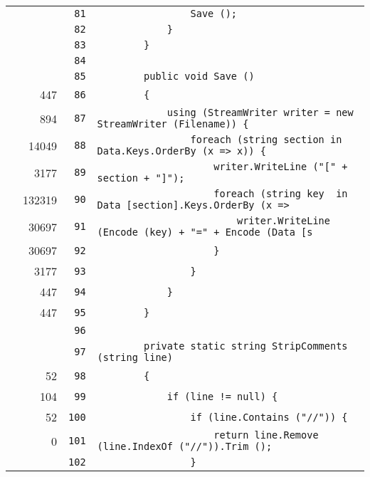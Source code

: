 \documentclass[a4paper,10pt]{article}
\begin{document}
\begin{longtable}[l]{lrrl}
\cellcolor{gray} &  & \verb~81~ & \verb~                Save ();~\\
\cellcolor{gray} &  & \verb~82~ & \verb~            }~\\
\cellcolor{gray} &  & \verb~83~ & \verb~        }~\\
\cellcolor{gray} &  & \verb~84~ & \verb~~\\
\cellcolor{gray} &  & \verb~85~ & \verb~        public void Save ()~\\
\cellcolor{green} & 447 & \verb~86~ & \verb~        {~\\
\cellcolor{green} & 894 & \verb~87~ & \verb~            using (StreamWriter writer = new StreamWriter (Filename)) {~\\
\cellcolor{green} & 14049 & \verb~88~ & \verb~                foreach (string section in Data.Keys.OrderBy (x => x)) {~\\
\cellcolor{green} & 3177 & \verb~89~ & \verb~                    writer.WriteLine ("[" + section + "]");~\\
\cellcolor{green} & 132319 & \verb~90~ & \verb~                    foreach (string key  in Data [section].Keys.OrderBy (x => ~\\
\cellcolor{green} & 30697 & \verb~91~ & \verb~                        writer.WriteLine (Encode (key) + "=" + Encode (Data [s~\\
\cellcolor{green} & 30697 & \verb~92~ & \verb~                    }~\\
\cellcolor{green} & 3177 & \verb~93~ & \verb~                }~\\
\cellcolor{green} & 447 & \verb~94~ & \verb~            }~\\
\cellcolor{green} & 447 & \verb~95~ & \verb~        }~\\
\cellcolor{gray} &  & \verb~96~ & \verb~~\\
\cellcolor{gray} &  & \verb~97~ & \verb~        private static string StripComments (string line)~\\
\cellcolor{green} & 52 & \verb~98~ & \verb~        {~\\
\cellcolor{green} & 104 & \verb~99~ & \verb~            if (line != null) {~\\
\cellcolor{green} & 52 & \verb~100~ & \verb~                if (line.Contains ("//")) {~\\
\cellcolor{red} & 0 & \verb~101~ & \verb~                    return line.Remove (line.IndexOf ("//")).Trim ();~\\
\cellcolor{gray} &  & \verb~102~ & \verb~                }~\\

\end{longtable}
\end{document}
